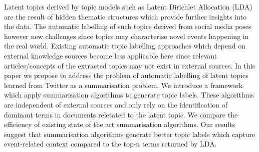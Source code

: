 Latent topics derived by topic models such as Latent Dirichlet Allocation (LDA) are the result of hidden thematic structures which provide further insights into the data. The automatic labelling of such topics derived from social media poses however new challenges since topics may characterise novel events happening in the real world. Existing automatic topic labelling approaches which depend on external knowledge sources become less applicable here since relevant articles/concepts of the extracted topics may not exist in external sources. In this paper we propose to address the problem of automatic labelling of latent topics learned from Twitter as a summarisation problem. We introduce a framework which apply summarisation algorithms to generate topic labels. These algorithms are independent of external sources and only rely on the identification of dominant terms in documents reletated to the latent topic. We compare the efficiency of existing state of the art summarisation algorithms. Our results suggest that summarisation algorithms generate better topic labels which capture event-related context compared to the top-n terms returned by LDA.
